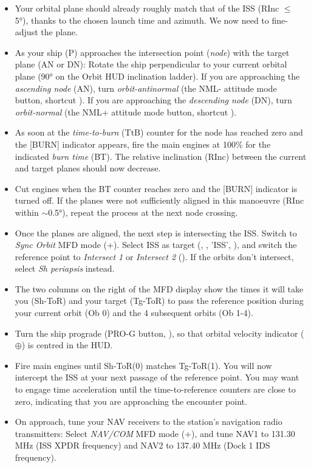 \documentclass[Orbiter User Manual.tex]{subfiles}
\begin{document}
\begin{itemize}
\item Your orbital plane should already roughly match that of the ISS (RInc $\leq$ 5°), thanks to the chosen launch time and azimuth. We now need to fine-adjust the plane.
\item As your ship (P) approaches the intersection point (\textit{node}) with the target plane (AN or DN): Rotate the ship perpendicular to your current orbital plane (90° on the Orbit HUD inclination ladder). If you are approaching the \textit{ascending node} (AN), turn \textit{orbit-antinormal} (the NML- attitude mode button, shortcut ). If you are approaching the \textit{descending node} (DN), turn \textit{orbit-normal} (the NML+ attitude mode button, shortcut \keystroke{;}).
\item As soon at the \textit{time-to-burn} (TtB) counter for the node has reached zero and the [BURN] indicator appears, fire the main engines at 100\% for the indicated \textit{burn time} (BT). The relative inclination (RInc) between the current and target planes should now decrease.
\item Cut engines when the BT counter reaches zero and the [BURN] indicator is turned off. If the planes were not sufficiently aligned in this manoeuvre (RInc within $\sim$0.5°), repeat the process at the next node crossing.
\item Once the planes are aligned, the next step is intersecting the ISS. Switch to \textit{Sync Orbit} MFD mode (\Shift{}+\Shift{}). Select ISS as target (\Shift{}, \Enter, 'ISS', \Enter), and switch the reference point to \textit{Intersect 1} or \textit{Intersect 2} (\Shift{}). If the orbits don't intersect, select \textit{Sh periapsis} instead.
\item The two columns on the right of the MFD display show the times it will take you (Sh-ToR) and your target (Tg-ToR) to pass the reference position during your current orbit (Ob 0) and the 4 subsequent orbits (Ob 1-4).
\item Turn the ship prograde (PRO-G button, \keystroke{[}), so that orbital velocity indicator ($\oplus$) is centred in the HUD.
\item Fire main engines until Sh-ToR(0) matches Tg-ToR(1). You will now intercept the ISS at your next passage of the reference point. You may want to engage time acceleration until the time-to-reference counters are close to zero, indicating that you are approaching the encounter point.
\item On approach, tune your NAV receivers to the station's navigation radio transmitters: Select \textit{NAV/COM} MFD mode (\Shift{}+\Shift{}), and tune NAV1 to 131.30 MHz (ISS XPDR frequency) and NAV2 to 137.40 MHz (Dock 1 IDS frequency).

\end{itemize}
\end{document}
